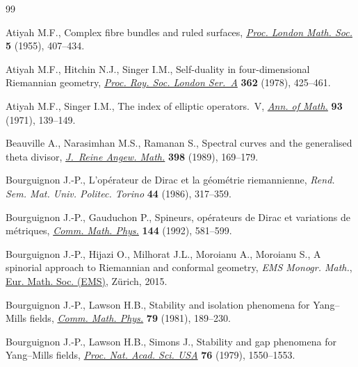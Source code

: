 \documentclass[pdftex]{sigma}
\begin{document}
\begin{thebibliography}{99}
\footnotesize\itemsep=0pt

Atiyah M.F., Complex fibre bundles and ruled surfaces, \href{https://doi.org/10.1112/plms/s3-5.4.407}{\textit{Proc. London
 Math. Soc.}} \textbf{5} (1955), 407--434.

Atiyah M.F., Hitchin N.J., Singer I.M., Self-duality in four-dimensional
 {R}iemannian geometry, \href{https://doi.org/10.1098/rspa.1978.0143}{\textit{Proc. Roy. Soc. London Ser.~A}} \textbf{362}
 (1978), 425--461.

Atiyah M.F., Singer I.M., The index of elliptic operators.~{V}, \href{https://doi.org/10.2307/1970757}{\textit{Ann. of
 Math.}} \textbf{93} (1971), 139--149.

Beauville A., Narasimhan M.S., Ramanan S., Spectral curves and the generalised
 theta divisor, \href{https://doi.org/10.1515/crll.1989.398.169}{\textit{J.~Reine Angew. Math.}} \textbf{398} (1989), 169--179.

Bourguignon J.-P., L'op\'{e}rateur de {D}irac et la g\'{e}om\'{e}trie
 riemannienne, \textit{Rend. Sem. Mat. Univ. Politec. Torino} \textbf{44}
 (1986), 317--359.

Bourguignon J.-P., Gauduchon P., Spineurs, op\'{e}rateurs de {D}irac et
 variations de m\'{e}triques, \href{https://doi.org/10.1007/BF02099184}{\textit{Comm. Math. Phys.}} \textbf{144} (1992),
 581--599.

Bourguignon J.-P., Hijazi O., Milhorat J.L., Moroianu A., Moroianu S., A
 spinorial approach to {R}iemannian and conformal geometry, \textit{EMS Monogr. Math.},
 \href{https://doi.org/10.4171/136}{Eur. Math. Soc. (EMS)}, Z\"urich, 2015.

Bourguignon J.-P., Lawson H.B., Stability and isolation phenomena for
 {Y}ang--{M}ills fields, \href{https://doi.org/10.1007/BF01942061}{\textit{Comm. Math. Phys.}} \textbf{79} (1981),
 189--230.

Bourguignon J.-P., Lawson H.B., Simons J., Stability and gap phenomena for
 {Y}ang--{M}ills fields, \href{https://doi.org/10.1073/pnas.76.4.1550}{\textit{Proc. Nat. Acad. Sci. USA}} \textbf{76}
 (1979), 1550--1553.


\end{thebibliography}
\end{document}
